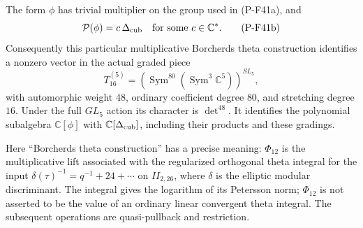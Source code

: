 \begin{corollary}
\label{cor:thetadiscriminant}
The form $\phi$ has trivial multiplier on the group used in
(P-F41a), and
\[
             \mathcal P(\phi)=c\,\Delta_{\rm cub}
             \quad\text{for some }c\in\mathbb C^*.
 \tag{P-F41b}
\]
Consequently this particular multiplicative Borcherds theta
construction identifies a nonzero vector in the actual graded piece
\[
 T^{(5)}_{16}
    =\left(\operatorname{Sym}^{80}
                    (\operatorname{Sym}^3\mathbb C^5)\right)^{SL_5},
 \tag{P-F41c}
\]
with automorphic weight $48$, ordinary coefficient degree $80$,
and stretching degree $16$. Under the full $GL_5$ action its
character is $\det^{48}$. It identifies the polynomial subalgebra
$\mathbb C[\phi]$ with $\mathbb C[\Delta_{\rm cub}]$,
including their products and these gradings.

Here ``Borcherds theta construction'' has a precise meaning:
$\Phi_{12}$ is the multiplicative lift associated with the
regularized orthogonal theta integral for the input
$\delta(\tau)^{-1}=q^{-1}+24+\cdots$ on $II_{2,26}$,
where $\delta$ is the elliptic modular discriminant.
The integral gives the logarithm of its Petersson norm;
$\Phi_{12}$ is not asserted to be the value of an ordinary
linear convergent theta integral. The subsequent operations
are quasi-pullback and restriction.
\end{corollary}

